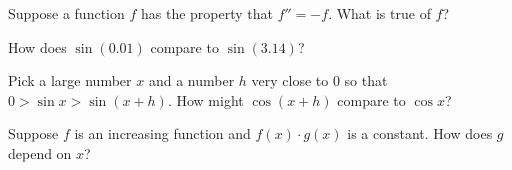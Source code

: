 \documentclass{ximera}
\begin{document}




\begin{problem}
  Suppose a function $f$ has the property that $f'' = -f$.  What is true of $f$?
  \begin{multipleChoice}
  \end{multipleChoice}
\end{problem}

\begin{problem}
  How does $\sin(0.01)$ compare to $\sin(3.14)$?
  \begin{multipleChoice}
  \end{multipleChoice}
\end{problem}

\begin{problem}
  Pick a large number $x$ and a number $h$ very close to $0$ so that $0 > \sin x > \sin (x+h)$.  How might $\cos (x+h)$ compare to $\cos x$?
  \begin{multipleChoice}
  \end{multipleChoice}
\end{problem}



\begin{problem}
  Suppose $f$ is an increasing function and $f(x) \cdot g(x)$ is a constant.  How does $g$ depend on $x$?
  \begin{multipleChoice}
  \end{multipleChoice}
\end{problem}
\end{document}

